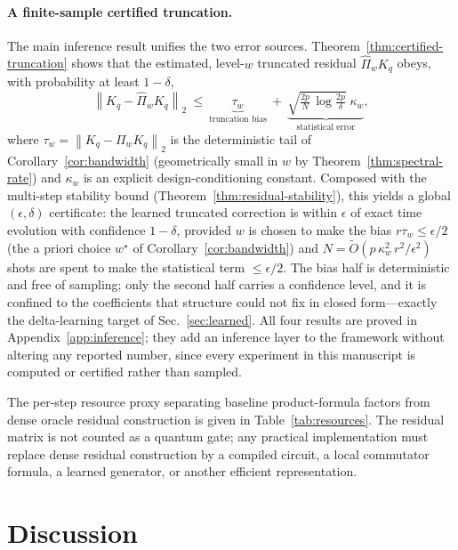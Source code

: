 \documentclass[aps,prxquantum,reprint,superscriptaddress,nofootinbib,amsmath,amssymb]{revtex4-2}
\newcommand{\norm}[1]{\left\lVert #1 \right\rVert}
\begin{document}
\paragraph{A finite-sample certified truncation.} The main inference result unifies the two error sources. Theorem~\ref{thm:certified-truncation} shows that the estimated, level-$w$ truncated residual $\widehat\Pi_wK_q$ obeys, with probability at least $1-\delta$,
\begin{equation}
    \norm{K_q-\widehat\Pi_wK_q}_2\ \le\ \underbrace{\tau_w}_{\text{truncation bias}}\ +\ \underbrace{\sqrt{\tfrac{2p}{N}\,\log\tfrac{2p}{\delta}}\;\kappa_w}_{\text{statistical error}},
    \label{eq:certified-truncation-intro}
\end{equation}
where $\tau_w=\norm{K_q-\Pi_wK_q}_2$ is the deterministic tail of Corollary~\ref{cor:bandwidth} (geometrically small in $w$ by Theorem~\ref{thm:spectral-rate}) and $\kappa_w$ is an explicit design-conditioning constant. Composed with the multi-step stability bound (Theorem~\ref{thm:residual-stability}), this yields a global $(\epsilon,\delta)$ certificate: the learned truncated correction is within $\epsilon$ of exact time evolution with confidence $1-\delta$, provided $w$ is chosen to make the bias $r\tau_w\le\epsilon/2$ (the a priori choice $w^\star$ of Corollary~\ref{cor:bandwidth}) and $N=\tilde O(p\,\kappa_w^2\,r^2/\epsilon^2)$ shots are spent to make the statistical term $\le\epsilon/2$. The bias half is deterministic and free of sampling; only the second half carries a confidence level, and it is confined to the coefficients that structure could not fix in closed form---exactly the delta-learning target of Sec.~\ref{sec:learned}. All four results are proved in Appendix~\ref{app:inference}; they add an inference layer to the framework without altering any reported number, since every experiment in this manuscript is computed or certified rather than sampled.

The per-step resource proxy separating baseline product-formula factors from dense oracle residual construction is given in Table~\ref{tab:resources}. The residual matrix is not counted as a quantum gate; any practical implementation must replace dense residual construction by a compiled circuit, a local commutator formula, a learned generator, or another efficient representation.


\section{Discussion}
\label{sec:discussion}
\end{document}
